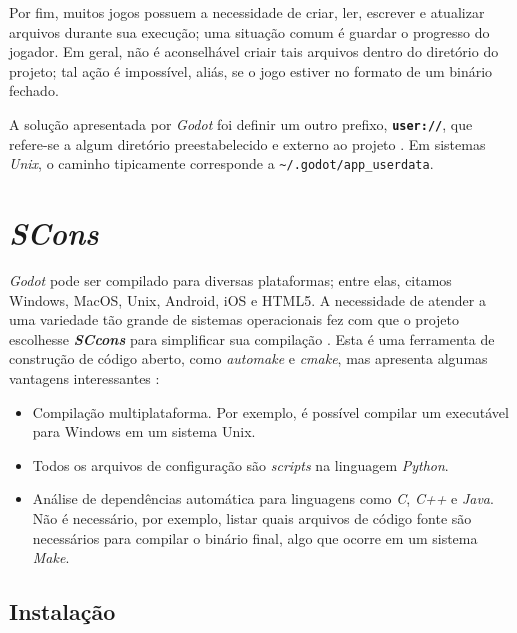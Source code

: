 Por fim, muitos jogos possuem a necessidade de criar, ler, escrever e atualizar arquivos durante sua execução; uma situação comum é guardar o progresso do jogador. Em geral, não é aconselhável criair tais arquivos dentro do diretório do projeto; tal ação é impossível, aliás, se o jogo estiver no formato de um binário fechado.

A solução apresentada por \textit{Godot} foi definir um outro prefixo, \textbf{\texttt{user://}}, que refere-se a algum diretório preestabelecido e externo ao projeto \citep{godotFileSystem}. Em sistemas \textit{Unix}, o caminho tipicamente corresponde a \texttt{\textasciitilde/.godot/app\_userdata}.


\section{\textit{SCons}}

\textit{Godot} pode ser compilado para diversas plataformas; entre elas, citamos Windows, MacOS, Unix, Android, iOS e HTML5. A necessidade de atender a uma variedade tão grande de sistemas operacionais fez com que o projeto escolhesse \textbf{\textit{SCcons}} para simplificar sua compilação \citep{godotScons}. Esta é uma ferramenta de construção de código aberto, como \textit{automake} e \textit{cmake}, mas apresenta algumas vantagens interessantes \citep{scons}:

\begin{itemize}
\item Compilação multiplataforma. Por exemplo, é possível compilar um executável para Windows em um sistema Unix.

\item Todos os arquivos de configuração são \textit{scripts} na linguagem \textit{Python}.

\item Análise de dependências automática para linguagens como \textit{C}, \textit{C++} e \textit{Java}. Não é necessário, por exemplo, listar quais arquivos de código fonte são necessários para compilar o binário final, algo que ocorre em um sistema \textit{Make}.
\end{itemize}


\subsection{Instalação}

